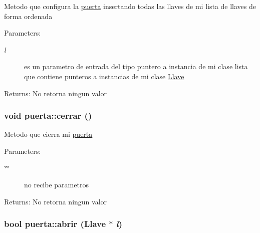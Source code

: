 Metodo que configura la \hyperlink{classpuerta}{puerta} insertando todas las llaves de mi lista de llaves de forma ordenada \begin{Desc}
\item[Parameters:]
\begin{description}
\item[{\em l}]es un parametro de entrada del tipo puntero a instancia de mi clase lista que contiene punteros a instancias de mi clase \hyperlink{classLlave}{Llave} \end{description}
\end{Desc}
\begin{Desc}
\item[Returns:]No retorna ningun valor \end{Desc}
\hypertarget{classpuerta_8c3078b9245cb0fbc37e7f1b662be74b}{
\subsubsection[cerrar]{\setlength{\rightskip}{0pt plus 5cm}void puerta::cerrar ()}}
\label{classpuerta_8c3078b9245cb0fbc37e7f1b662be74b}


Metodo que cierra mi \hyperlink{classpuerta}{puerta} \begin{Desc}
\item[Parameters:]
\begin{description}
\item[{\em \char`\"{}\char`\"{}}]no recibe parametros \end{description}
\end{Desc}
\begin{Desc}
\item[Returns:]No retorna ningun valor \end{Desc}
\hypertarget{classpuerta_a70c9e4a8a59555d1ba15caff7849497}{
\subsubsection[abrir]{\setlength{\rightskip}{0pt plus 5cm}bool puerta::abrir ({\bf Llave} $\ast$ {\em l})}}
\label{classpuerta_a70c9e4a8a59555d1ba15caff7849497}


